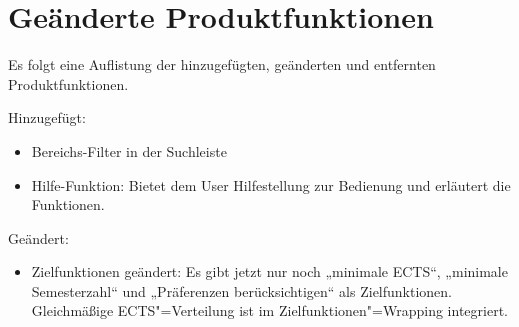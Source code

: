 \FloatBarrier
\section{Geänderte Produktfunktionen}

Es folgt eine Auflistung der hinzugefügten, geänderten und entfernten Produktfunktionen.

Hinzugefügt:
\begin{itemize}
	\item Bereichs-Filter in der Suchleiste
	\item Hilfe-Funktion: Bietet dem User Hilfestellung zur Bedienung und erläutert die Funktionen.
\end{itemize}

Geändert: 
\begin{itemize}
	\item Zielfunktionen geändert: Es gibt jetzt nur noch „minimale ECTS“, „minimale Semesterzahl“ und „Präferenzen berücksichtigen“ als Zielfunktionen. Gleichmäßige ECTS"=Verteilung ist im Zielfunktionen"=Wrapping integriert.
\end{itemize}